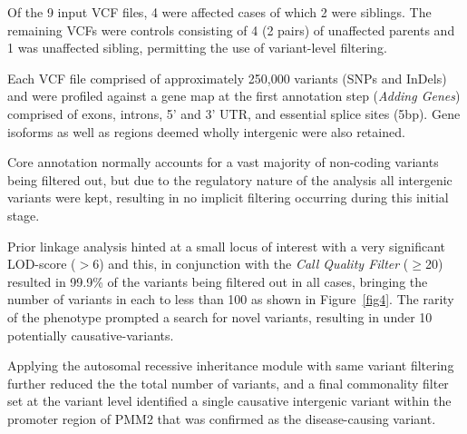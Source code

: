 \documentclass[twocolumn]{bmcart}%
\begin{document}
Of the 9 input VCF files, 4 were affected cases of which 2 were siblings. The remaining VCFs were controls consisting of 4 (2 pairs) of unaffected parents and 1 was unaffected sibling, permitting the use of variant-level filtering.

Each VCF file comprised of approximately 250,000 variants (SNPs and InDels) and were profiled against a gene map at the first annotation step (\textit{Adding Genes}) comprised of exons, introns, 5' and 3' UTR, and essential splice sites (5bp). Gene isoforms as well as regions deemed wholly intergenic were also retained.

Core annotation normally accounts for a vast majority of non-coding variants being filtered out, but due to the regulatory nature of the analysis all intergenic variants were kept, resulting in no implicit filtering occurring during this initial stage.

Prior linkage analysis hinted at a small locus of interest with a very significant LOD-score ($>$6) and this, in conjunction with the \textit{Call Quality Filter} ($\geq$20) resulted in 99.9\% of the variants being filtered out in all cases, bringing the number of variants in each to less than 100 as shown in Figure~\ref{fig4}. The rarity of the phenotype prompted a search for novel variants, resulting in under 10 potentially causative-variants.  

Applying the autosomal recessive inheritance module with same variant filtering further reduced the the total number of variants, and a final commonality filter set at the variant level identified a single causative intergenic variant within the promoter region of PMM2 that was confirmed as the disease-causing variant.




\end{document}
